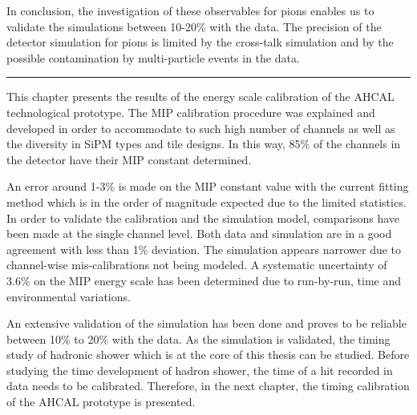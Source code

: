 In conclusion, the investigation of these observables for pions enables us to validate the simulations between 10-20\% with the data. The precision of the detector simulation for pions is limited by the cross-talk simulation and by the possible contamination by multi-particle events in the data.

\begin{center}
  \rule{0.5\textwidth}{.4pt}
\end{center}

This chapter presents the results of the energy scale calibration of the AHCAL technological prototype. The MIP calibration procedure was explained and developed in order to accommodate to such high number of channels as well as the diversity in SiPM types and tile designs. In this way, 85\% of the channels in the detector have their MIP constant determined.

An error around 1-3\% is made on the MIP constant value with the current fitting method which is in the order of magnitude expected due to the limited statistics. In order to validate the calibration and the simulation model, comparisons have been made at the single channel level. Both data and simulation are in a good agreement with less than 1\% deviation. The simulation appears narrower due to channel-wise mis-calibrations not being modeled. A systematic uncertainty of 3.6\% on the MIP energy scale has been determined due to run-by-run, time and environmental variations.

An extensive validation of the simulation has been done and proves to be reliable between 10\% to 20\% with the data. As the simulation is validated, the timing study of hadronic shower which is at the core of this thesis can be studied. Before studying the time development of hadron shower, the time of a hit recorded in data needs to be calibrated. Therefore, in the next chapter, the timing calibration of the AHCAL prototype is presented.

